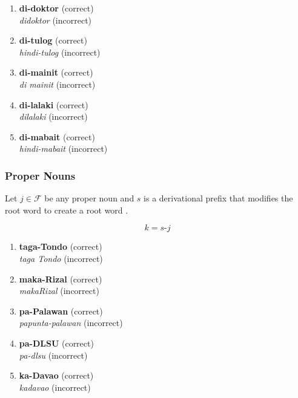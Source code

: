 \begin{example}
\end{example}
\begin{enumerate}
      \item \textbf{di-doktor} (correct) \\
            \textit{didoktor} (incorrect)
      \item \textbf{di-tulog} (correct) \\
            \textit{hindi-tulog} (incorrect)
      \item \textbf{di-mainit} (correct) \\
            \textit{di mainit} (incorrect)
      \item \textbf{di-lalaki} (correct) \\
            \textit{dilalaki} (incorrect)
      \item \textbf{di-mabait} (correct) \\
            \textit{hindi-mabait} (incorrect)
\end{enumerate}

\subsubsection{Proper Nouns}
\label{proper_nouns_chapter}
Let $j \in \mathcal{F}$ be any proper noun and $s$ is a derivational prefix that modifies the root word to create a root word \cite{rafael2018}.

\[
      k = s\texttt{-}j
\]

\begin{example}
\end{example}
\begin{enumerate}
      \item \textbf{taga-Tondo} (correct) \\
            \textit{taga Tondo} (incorrect)
      \item \textbf{maka-Rizal} (correct) \\
            \textit{makaRizal} (incorrect)
      \item \textbf{pa-Palawan} (correct) \\
            \textit{papunta-palawan} (incorrect)
      \item \textbf{pa-DLSU} (correct) \\
            \textit{pa-dlsu} (incorrect)
      \item \textbf{ka-Davao} (correct) \\
            \textit{kadavao} (incorrect)
\end{enumerate}

